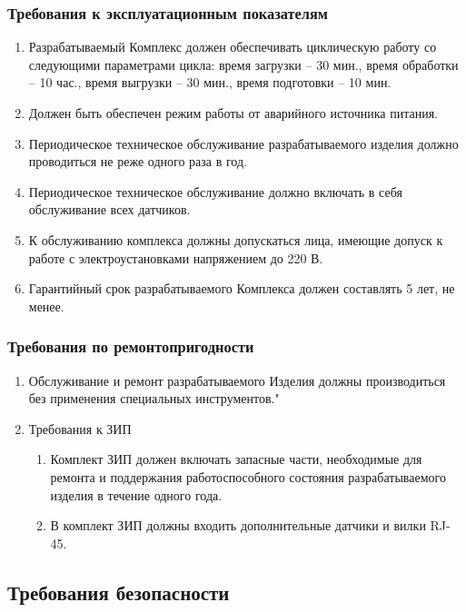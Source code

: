 			\subsubsection{Требования к эксплуатационным показателям}
				\begin{enumerate}
\changefontsizes[14pt]{14pt}
					\item Разрабатываемый Комплекс должен обеспечивать циклическую работу со следующими параметрами цикла: время загрузки – 30 мин., время обработки – 10 час., время выгрузки – 30 мин., время подготовки – 10 мин.
					\item Должен быть обеспечен режим работы от аварийного источника питания.
					\item Периодическое техническое обслуживание разрабатываемого изделия должно проводиться не реже одного раза в год.
					\item Периодическое техническое обслуживание должно включать в себя обслуживание всех датчиков.
					\item К обслуживанию комплекса должны допускаться лица, имеющие допуск к работе с электроустановками напряжением до 220 В.
					\item Гарантийный срок разрабатываемого Комплекса должен составлять 5 лет, не менее.
				\end{enumerate}
			\subsubsection{Требования по ремонтопригодности}
				\begin{enumerate}
\changefontsizes[14pt]{14pt}
					\item Обслуживание и ремонт разрабатываемого Изделия должны производиться без применения специальных инструментов."
					\item Требования к ЗИП
						\begin{enumerate}
\changefontsizes[14pt]{14pt}
							\item Комплект ЗИП должен включать запасные части, необходимые для ремонта и поддержания работоспособного состояния разрабатываемого изделия в течение одного года.
							\item В комплект ЗИП должны входить дополнительные датчики и вилки RJ-45.
						\end{enumerate}
				\end{enumerate}
		\subsection{Требования безопасности}
